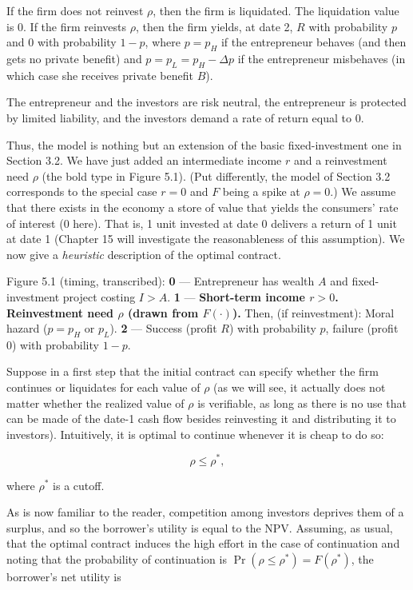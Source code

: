 \documentclass[11pt,a4paper]{article}
\begin{document}
If the firm does not reinvest \(\rho\), then the firm is liquidated. The liquidation value is 0. If
the firm reinvests \(\rho\), then the firm yields, at date 2, \(R\) with probability \(p\) and 0
with probability \(1 - p\), where \(p = p_H\) if the entrepreneur behaves (and then gets no private
benefit) and \(p = p_L = p_H - \Delta p\) if the entrepreneur misbehaves (in which case she receives
private benefit \(B\)).

The entrepreneur and the investors are risk neutral, the entrepreneur is protected by limited
liability, and the investors demand a rate of return equal to 0.

Thus, the model is nothing but an extension of the basic fixed-investment one in Section 3.2. We
have just added an intermediate income \(r\) and a reinvestment need \(\rho\) (the bold type in
Figure 5.1). (Put differently, the model of Section 3.2 corresponds to the special case \(r = 0\)
and \(F\) being a spike at \(\rho = 0\).) We assume that there exists in the economy a store of
value that yields the consumers' rate of interest (0 here). That is, 1 unit invested at date 0
delivers a return of 1 unit at date 1 (Chapter 15 will investigate the reasonableness of this
assumption). We now give a \emph{heuristic} description of the optimal contract.

Figure 5.1 (timing, transcribed): \textbf{0} --- Entrepreneur has wealth \(A\) and fixed-investment
project costing \(I > A\). \textbf{1} --- \textbf{Short-term income \(r > 0\). Reinvestment need
\(\rho\) (drawn from \(F(\cdot)\)).} Then, (if reinvestment): Moral hazard (\(p = p_H\) or \(p_L\)).
\textbf{2} --- Success (profit \(R\)) with probability \(p\), failure (profit 0) with probability
\(1 - p\).

Suppose in a first step that the initial contract can specify whether the firm continues or
liquidates for each value of \(\rho\) (as we will see, it actually does not matter whether the
realized value of \(\rho\) is verifiable, as long as there is no use that can be made of the date-1
cash flow besides reinvesting it and distributing it to investors). Intuitively, it is optimal to
continue whenever it is cheap to do so:

\[\rho \leqslant \rho^*,\]

where \(\rho^*\) is a cutoff.

As is now familiar to the reader, competition among investors deprives them of a surplus, and so the
borrower's utility is equal to the NPV. Assuming, as usual, that the optimal contract induces the
high effort in the case of continuation and noting that the probability of continuation is
\(\Pr(\rho \leqslant \rho^*) = F(\rho^*)\), the borrower's net utility is
\end{document}

